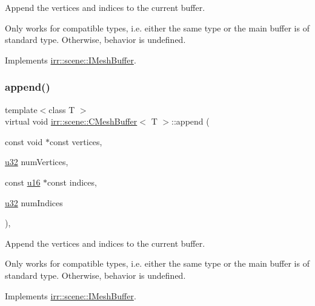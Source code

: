 Append the vertices and indices to the current buffer. 

Only works for compatible types, i.\+e. either the same type or the main buffer is of standard type. Otherwise, behavior is undefined. 

Implements \hyperlink{classirr_1_1scene_1_1IMeshBuffer_ac9e9d7fbb10175cc6f1596ba3fe4e8f9}{irr\+::scene\+::\+I\+Mesh\+Buffer}.

\mbox{\label{classirr_1_1scene_1_1CMeshBuffer_a7efd85cba5d5d86bee8c2ea2fe0524d9}} 
\subsubsection{\texorpdfstring{append()}{append()}\hspace{0.1cm}{\footnotesize\ttfamily [2/4]}}
{\footnotesize\ttfamily template$<$class T $>$ \\
virtual void \hyperlink{classirr_1_1scene_1_1CMeshBuffer}{irr\+::scene\+::\+C\+Mesh\+Buffer}$<$ T $>$\+::append (\begin{DoxyParamCaption}\item[{const void $\ast$const}]{vertices,  }\item[{\hyperlink{namespaceirr_a0416a53257075833e7002efd0a18e804}{u32}}]{num\+Vertices,  }\item[{const \hyperlink{namespaceirr_ae9f8ec82692ad3b83c21f555bfa70bcc}{u16} $\ast$const}]{indices,  }\item[{\hyperlink{namespaceirr_a0416a53257075833e7002efd0a18e804}{u32}}]{num\+Indices }\end{DoxyParamCaption})\hspace{0.3cm}{\ttfamily [inline]}, {\ttfamily [virtual]}}



Append the vertices and indices to the current buffer. 

Only works for compatible types, i.\+e. either the same type or the main buffer is of standard type. Otherwise, behavior is undefined. 

Implements \hyperlink{classirr_1_1scene_1_1IMeshBuffer_ac9e9d7fbb10175cc6f1596ba3fe4e8f9}{irr\+::scene\+::\+I\+Mesh\+Buffer}.

\mbox{\label{classirr_1_1scene_1_1CMeshBuffer_af48b88e6c1bd79e6abd6a6803aa106c0}} 
